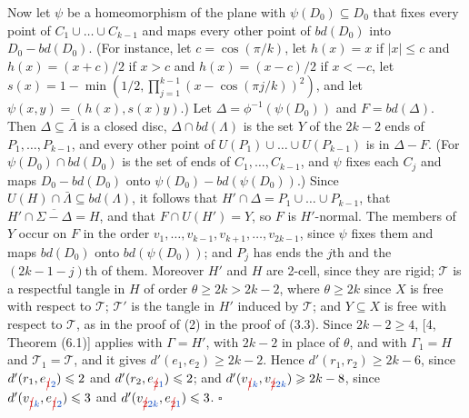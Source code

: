 {Now let $\psi$ be a homeomorphism of the plane with $\psi(D_0) \subseteq D_0$ that fixes every point of $C_1 \cup \dots \cup C_{k-1}$ and maps every other point of $bd(D_0)$ into $D_0 - bd(D_0)$. (For instance, let $c = \cos(\pi/k)$, let $h(x) = x$ if $|x| \le c$ and $h(x) = (x + c)/2$ if $x > c$ and $h(x) = (x - c)/2$ if $x < -c$, let $s(x) = 1 - \min(1/2, \prod_{j=1}^{k-1} (x - \cos(\pi j/k))^2)$, and let $\psi(x, y) = (h(x), s(x)y)$.) Let $\Delta = \phi^{-1}(\psi(D_0))$ and $F = bd(\Delta)$. Then $\Delta \subseteq \bar{\Lambda}$ is a closed disc, $\Delta \cap bd(\Lambda)$ is the set $Y$ of the $2k-2$ ends of $P_1, \dots, P_{k-1}$, and every other point of $U(P_1) \cup \dots \cup U(P_{k-1})$ is in $\Delta - F$. (For $\psi(D_0) \cap bd(D_0)$ is the set of ends of $C_1, \dots, C_{k-1}$, and $\psi$ fixes each $C_j$ and maps $D_0 - bd(D_0)$ onto $\psi(D_0) - bd(\psi(D_0))$.) Since $U(H) \cap \bar{\Lambda} \subseteq bd(\Lambda)$, it follows that $H' \cap \Delta = P_1 \cup \dots \cup P_{k-1}$, that $H' \cap \overline{\Sigma - \Delta} = H$, and that $F \cap U(H') = Y$, so $F$ is $H'$-normal. The members of $Y$ occur on $F$ in the order $v_1, \dots, v_{k-1}, v_{k+1}, \dots, v_{2k-1}$, since $\psi$ fixes them and maps $bd(D_0)$ onto $bd(\psi(D_0))$; and $P_j$ has ends the $j$th and the $(2k-1-j)$th of them. Moreover $H'$ and $H$ are 2-cell, since they are rigid; $\mathscr{T}$ is a respectful tangle in $H$ of order $\theta \ge 2k > 2k-2$, where $\theta \ge 2k$ since $X$ is free with respect to $\mathscr{T}$; $\mathscr{T}'$ is the tangle in $H'$ induced by $\mathscr{T}$; and $Y \subseteq X$ is free with respect to $\mathscr{T}$, as in the proof of (2) in the proof of (3.3). Since $2k - 2 \ge 4$, [4, Theorem (6.1)] applies with $\Gamma = H'$, with $2k-2$ in place of $\theta$, and with $\Gamma_1 = H$ and $\mathscr{T}_1 = \mathscr{T}$, and it gives $d'(e_1, e_2) \ge 2k-2$.} Hence $d'(r_1, r_2) \ge 2k - 6$, since $d'(r_1, e_{\delm{1}\fix{2}}) \le 2$ and $d'(r_2, e_{\delm{2}\fix{1}}) \le 2$; and $d'(v_{\delm{1}\fix{k}}, v_{\delm{2}\fix{2k}}) \ge 2k - 8$, since $d'(v_{\delm{1}\fix{k}}, e_{\delm{1}\fix{2}}) \le 3$ and $d'(v_{\delm{2}\fix{2k}}, e_{\delm{2}\fix{1}}) \le 3$. $\square$

